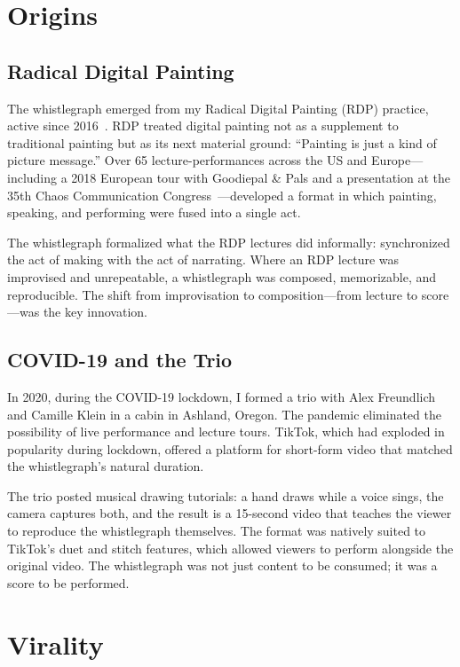 \documentclass[10pt,letterpaper,twocolumn]{article}
\begin{document}
\section{Origins}

\subsection{Radical Digital Painting}

The whistlegraph emerged from my Radical Digital Painting (RDP) practice, active since 2016~\citep{scudder2017manifesto}. RDP treated digital painting not as a supplement to traditional painting but as its next material ground: ``Painting is just a kind of picture message.'' Over 65 lecture-performances across the US and Europe---including a 2018 European tour with Goodiepal \& Pals and a presentation at the 35th Chaos Communication Congress~\citep{scudder2018rdp35c3}---developed a format in which painting, speaking, and performing were fused into a single act.

The whistlegraph formalized what the RDP lectures did informally: synchronized the act of making with the act of narrating. Where an RDP lecture was improvised and unrepeatable, a whistlegraph was composed, memorizable, and reproducible. The shift from improvisation to composition---from lecture to score---was the key innovation.

\subsection{COVID-19 and the Trio}

In 2020, during the COVID-19 lockdown, I formed a trio with Alex Freundlich and Camille Klein in a cabin in Ashland, Oregon. The pandemic eliminated the possibility of live performance and lecture tours. TikTok, which had exploded in popularity during lockdown, offered a platform for short-form video that matched the whistlegraph's natural duration.

The trio posted musical drawing tutorials: a hand draws while a voice sings, the camera captures both, and the result is a 15-second video that teaches the viewer to reproduce the whistlegraph themselves. The format was natively suited to TikTok's duet and stitch features, which allowed viewers to perform alongside the original video. The whistlegraph was not just content to be consumed; it was a score to be performed.

\section{Virality}
\end{document}
